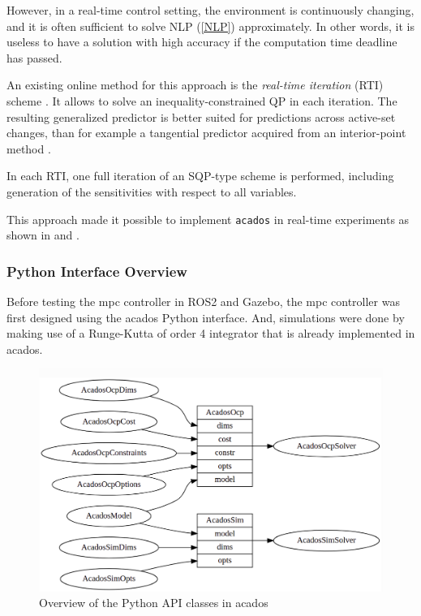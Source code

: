 \documentclass{thesisreport}
\begin{document}
However, in a real-time control setting, the environment is continuously changing, and it is often sufficient to solve NLP (\ref{NLP}) approximately. In other words, it is useless to have a solution with high accuracy if the computation time deadline has passed.

An existing online method for this approach is the \textit{real-time iteration} (RTI) scheme \cite{Diehl2002}. It allows to solve an inequality-constrained QP in each iteration. The resulting generalized predictor is better suited for predictions across active-set changes, than for example a tangential predictor  acquired from an interior-point method \cite{acados2019}.

 In each RTI, one full iteration of an SQP-type scheme is performed, including generation of the sensitivities with respect to all variables. 
 
 This approach made it possible to implement \texttt{acados} in real-time experiments as shown in \cite{carlos_sartor_zanelli_frison_burgard_diehl_oriolo_2020}
 and \cite{kloeser_schoels_sartor_zanelli_prison_diehl_2020}.
 
 \newpage
 
 \subsubsection{Python Interface Overview}
 
 Before testing the mpc controller in ROS2 and Gazebo, the mpc controller was first designed using the acados Python interface. And, simulations were done by making use of a Runge-Kutta of order 4 integrator that is already implemented in acados. 
 
 
 \begin{figure}[h]
 	\centering
 	\includegraphics[width=\textwidth]{Images/acados/python_interface.png}
 	\caption{Overview of the Python API classes in acados \cite{Verschueren2018}}
 	\label{fig:python_interface}
 \end{figure}
 
\end{document}
